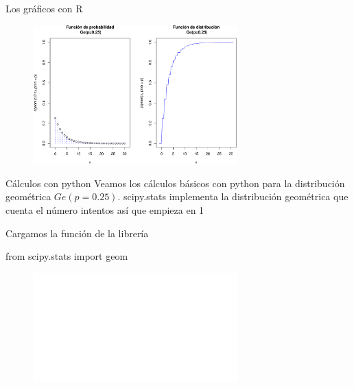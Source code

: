 \documentclass[
  ignorenonframetext,
  aspectratio=169]{beamer}
\newenvironment{Shaded}{\begin{snugshade}}{\end{snugshade}}
\newcommand{\ImportTok}[1]{\textcolor[rgb]{0.00,0.46,0.62}{#1}}
\newcommand{\NormalTok}[1]{\textcolor[rgb]{0.00,0.23,0.31}{#1}}
\begin{document}
\begin{frame}{Los gráficos con R}
\protect\hypertarget{los-gruxe1ficos-con-r}{}
\begin{figure}

{\centering \includegraphics[width=0.7\textwidth,height=\textheight]{Tema_3_1_Notables_files/figure-beamer/graficos22-1.pdf}

}

\end{figure}
\end{frame}

\begin{frame}[fragile]{Cálculos con python}
\protect\hypertarget{cuxe1lculos-con-python}{}
Veamos los cálculos básicos con python para la distribución geométrica
\(Ge(p=0.25)\). scipy.stats implementa la distribución geométrica que
cuenta el número intentos así que empieza en 1

Cargamos la función de la librería

\begin{Shaded}
\begin{Highlighting}[]
\ImportTok{from}\NormalTok{ scipy.stats }\ImportTok{import}\NormalTok{ geom}
\end{Highlighting}
\end{Shaded}

\begin{figure}

{\centering \includegraphics[width=0.7\textwidth,height=\textheight]{Tema_3_1_Notables_files/figure-beamer/geom1-1.pdf}

}

\end{figure}
\end{frame}
\end{document}
